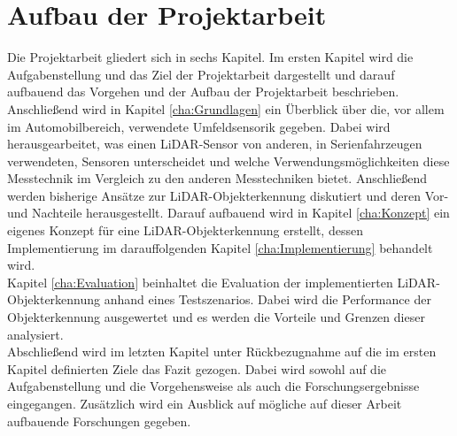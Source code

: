 \section{Aufbau der Projektarbeit}\label{sec:Aufbau}
Die Projektarbeit gliedert sich in sechs Kapitel. Im ersten Kapitel wird die Aufgabenstellung und das Ziel der Projektarbeit dargestellt und darauf aufbauend das Vorgehen und der Aufbau der Projektarbeit beschrieben.\\
Anschließend wird in Kapitel \ref{cha:Grundlagen} ein Überblick über die, vor allem im Automobilbereich, verwendete Umfeldsensorik gegeben. Dabei wird herausgearbeitet, was einen \ac{LiDAR}-Sensor von anderen, in Serienfahrzeugen verwendeten, Sensoren unterscheidet und welche Verwendungsmöglichkeiten diese Messtechnik im Vergleich zu den anderen Messtechniken bietet. Anschließend werden bisherige Ansätze zur \ac{LiDAR}-Objekterkennung diskutiert und deren Vor- und Nachteile herausgestellt.
Darauf aufbauend wird in Kapitel \ref{cha:Konzept} ein eigenes Konzept für eine \ac{LiDAR}-Objekterkennung erstellt, dessen Implementierung im darauffolgenden Kapitel \ref{cha:Implementierung} behandelt wird.\\
Kapitel \ref{cha:Evaluation} beinhaltet die Evaluation der implementierten \ac{LiDAR}-Objekterkennung anhand eines Testszenarios. Dabei wird die Performance der Objekterkennung ausgewertet und es werden die Vorteile und Grenzen dieser analysiert.\\
Abschließend wird im letzten Kapitel unter Rückbezugnahme auf die im ersten Kapitel definierten Ziele das Fazit gezogen. Dabei wird sowohl auf die Aufgabenstellung und die Vorgehensweise als auch die Forschungsergebnisse eingegangen. Zusätzlich wird ein Ausblick auf mögliche auf dieser Arbeit aufbauende Forschungen gegeben.